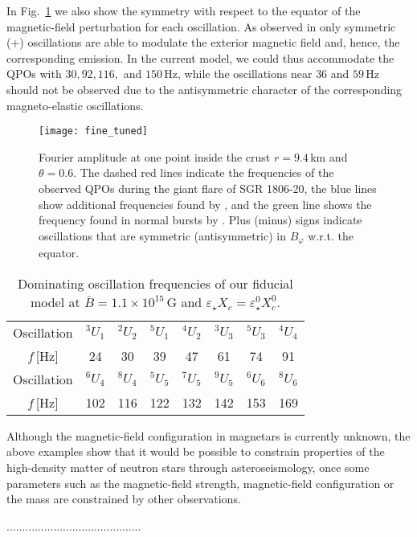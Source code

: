 \documentclass[useAMS,usenatbib]{mnras}
\begin{document}
In Fig.~\ref{fig_fit_freqs} we also show the symmetry with respect to the equator of the magnetic-field perturbation for each oscillation. As observed in \cite{Gabler2014a, Gabler2014b} only symmetric (+) oscillations are able to modulate the exterior magnetic field and, hence, the corresponding emission. In the current model, we could thus accommodate the QPOs with $30, 92, 116,$ and $150\,$Hz, while the oscillations near $36$ and $59\,$Hz should not be observed due to the antisymmetric character of the corresponding magneto-elastic oscillations.

%
\begin{figure}
\texttt{[image: fine\_tuned]}
\caption{Fourier amplitude at one point inside the crust  $r=9.4\,$km and 
$\theta=0.6$. The dashed red lines indicate the frequencies of the observed 
QPOs during the giant flare of SGR 1806-20, the blue lines show additional 
frequencies found by \protect\cite{Hambaryan2011}, and the green line shows the 
frequency found in normal bursts by \protect\cite{Huppenkothen2014b}. Plus 
(minus) signs indicate oscillations that are symmetric (antisymmetric) in 
$B_\varphi$  w.r.t. the equator.
}
\label{fig_fit_freqs}
\end{figure}
\begin{table}
\begin{tabular}{c | c c c c c c c}
Oscillation&$^3U_1$&$^2U_2$&$^5U_1$&$^4U_2$&$^3U_3$&$^5U_3$&$^4U_4$\\
 $f\,$[Hz]&24 &30&39&47&61&74&91\\
\hline
Oscillation&$^6U_4$&$^8U
 _4$&$^5U_5$&$^7U_5$&$^9U_5$&$^6U_6$&$^8U_6$\\
 $f\,$[Hz]&102&116&122&132&142&153&169\\ 
\end{tabular}
\caption{Dominating oscillation frequencies of our fiducial model at $\bar 
B=1.1\times10^{15}\,$G and $\varepsilon_\star X_c=\varepsilon_\star^0 X_c^0$.}
\label{tab_fit_f}
\end{table}
%

 Although the magnetic-field configuration in magnetars is currently unknown, 
the above examples show that it would be possible to constrain properties of 
the high-density matter of neutron stars through asteroseismology, once some 
parameters such as the magnetic-field strength, magnetic-field configuration or 
the mass are constrained by other observations.

...........................................
\end{document}
